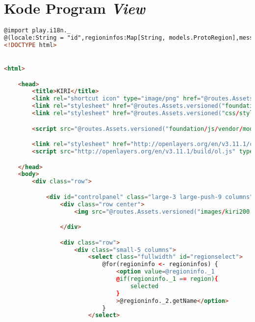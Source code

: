 \chapter{Kode Program \textit{View}}
\label{app:D}

\singlespacing 
%
%
\begin{lstlisting}[language=HTML,basicstyle=\tiny,caption=index.scala.html]
@import play.i18n._
@(locale:String = "id",regioninfos:Map[String, models.ProtoRegion],message:String,region:String)
<!DOCTYPE html>


<html>

    <head>
        <title>KIRI</title>
        <link rel="shortcut icon" type="image/png" href="@routes.Assets.versioned("images/favicon.ico")">
        <link rel="stylesheet" href="@routes.Assets.versioned("foundation/css/foundation.min.css")" type="text/css">
        <link rel="stylesheet" href="@routes.Assets.versioned("css/styleIndex.css")" type="text/css">

        <script src="@routes.Assets.versioned("foundation/js/vendor/modernizr.js")"></script>

        <link rel="stylesheet" href="http://openlayers.org/en/v3.11.1/css/ol.css" type="text/css">
        <script src="http://openlayers.org/en/v3.11.1/build/ol.js" type="text/javascript"></script>

    </head>
    <body>
        <div class="row">

            <div id="controlpanel" class="large-3 large-push-9 columns">
                <div class="row center">
                    <img src="@routes.Assets.versioned("images/kiri200.png")" alt="KIRI logo" />

                </div>

                <div class="row">
                    <div class="small-5 columns">
                        <select class="fullwidth" id="regionselect">
                            @for(regioninfo <- regioninfos) {
                                <option value=@regioninfo._1
                                @if(regioninfo._1 == region){
                                    selected
                                }
                                >@regioninfo._2.getName</option>
                            }
                        </select>


\end{lstlisting}
